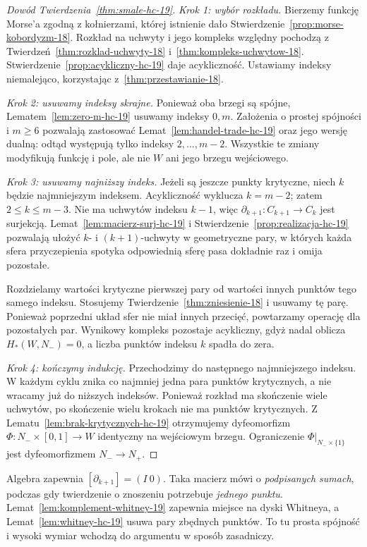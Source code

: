 \begin{proof}[Dowód Twierdzenia~\ref{thm:smale-hc-19}]
\emph{Krok 1: wybór rozkładu.}
Bierzemy funkcję Morse'a
zgodną z kołnierzami,
której istnienie dało
Stwierdzenie~\ref{prop:morse-kobordyzm-18}.
Rozkład na uchwyty
i jego kompleks względny
pochodzą z
Twierdzeń~\ref{thm:rozklad-uchwyty-18}
i~\ref{thm:kompleks-uchwytow-18}.
Stwierdzenie~\ref{prop:acykliczny-hc-19}
daje acykliczność.
Ustawiamy indeksy
niemalejąco, korzystając
z~\ref{thm:przestawianie-18}.

\emph{Krok 2: usuwamy indeksy skrajne.}
Ponieważ oba brzegi są
spójne, Lematem~\ref{lem:zero-m-hc-19}
usuwamy indeksy $0,m$.
Założenia o prostej
spójności i $m\geq6$
pozwalają zastosować
Lemat~\ref{lem:handel-trade-hc-19}
oraz jego wersję dualną:
odtąd występują tylko
indeksy $2,\ldots,m-2$.
Wszystkie te zmiany
modyfikują funkcję
i pole, ale nie $W$
ani jego brzegu wejściowego.

\emph{Krok 3: usuwamy najniższy indeks.}
Jeżeli są jeszcze punkty
krytyczne, niech $k$
będzie najmniejszym
indeksem. Acykliczność
wyklucza $k=m-2$;
zatem $2\leq k\leq m-3$.
Nie ma uchwytów indeksu
$k-1$, więc
$\partial_{k+1}:C_{k+1}\to C_k$
jest surjekcją.
Lemat~\ref{lem:macierz-surj-hc-19}
i Stwierdzenie~\ref{prop:realizacja-hc-19}
pozwalają ułożyć
$k$- i $(k+1)$-uchwyty
w geometryczne pary,
w których każda
sfera przyczepienia
spotyka odpowiednią
sferę pasa dokładnie raz
i omija pozostałe.

Rozdzielamy wartości
krytyczne pierwszej pary
od wartości innych
punktów tego samego
indeksu. Stosujemy
Twierdzenie~\ref{thm:zniesienie-18}
i usuwamy tę parę.
Ponieważ poprzedni
układ sfer nie miał
innych przecięć,
powtarzamy operację
dla pozostałych par.
Wynikowy kompleks
pozostaje acykliczny,
gdyż nadal oblicza
$H_*(W,N_-)=0$,
a liczba punktów
indeksu $k$ spadła
do zera.

\emph{Krok 4: kończymy indukcję.}
Przechodzimy do następnego
najmniejszego indeksu.
W każdym cyklu znika
co najmniej jedna
para punktów krytycznych,
a nie wracamy już do
niższych indeksów.
Ponieważ rozkład ma
skończenie wiele uchwytów,
po skończenie wielu
krokach nie ma punktów
krytycznych. Z
Lematu~\ref{lem:brak-krytycznych-hc-19}
otrzymujemy dyfeomorfizm
$\Phi:N_-\times[0,1]\to W$
identyczny na wejściowym
brzegu. Ograniczenie
$\Phi|_{N_-\times\{1\}}$
jest dyfeomorfizmem
$N_-\to N_+$.
\end{proof}

\begin{uwaga}
Algebra zapewnia
$[\partial_{k+1}]=(I\ 0)$.
Taka macierz mówi o
\emph{podpisanych sumach},
podczas gdy twierdzenie
o znoszeniu potrzebuje
\emph{jednego punktu}.
Lemat~\ref{lem:komplement-whitney-19}
zapewnia miejsce
na dyski Whitneya,
a Lemat~\ref{lem:whitney-hc-19}
usuwa pary zbędnych
punktów. To tu
prosta spójność i
wysoki wymiar
wchodzą do argumentu
w sposób zasadniczy.
\end{uwaga}

